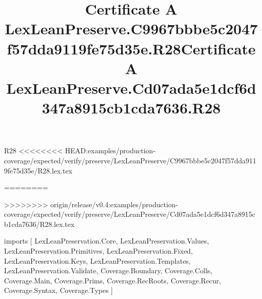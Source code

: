 \begin{lexlean}{R28}
<<<<<<<< HEAD:examples/production-coverage/expected/verify/preserve/LexLeanPreserve/C9967bbbe5c2047f57dda9119fe75d35e/R28.lex.tex
\title{Certificate A LexLeanPreserve.C9967bbbe5c2047f57dda9119fe75d35e.R28}
========
\title{Certificate A LexLeanPreserve.Cd07ada5e1dcf6d347a8915cb1cda7636.R28}
>>>>>>>> origin/release/v0.4:examples/production-coverage/expected/verify/preserve/LexLeanPreserve/Cd07ada5e1dcf6d347a8915cb1cda7636/R28.lex.tex
\begin{coremodule}
imports [
  LexLeanPreservation.Core,
  LexLeanPreservation.Values,
  LexLeanPreservation.Primitives,
  LexLeanPreservation.Fixed,
  LexLeanPreservation.Keys,
  LexLeanPreservation.Templates,
  LexLeanPreservation.Validate,
  Coverage.Boundary,
  Coverage.Colls,
  Coverage.Main,
  Coverage.Prims,
  Coverage.RecRoots,
  Coverage.Recur,
  Coverage.Syntax,
  Coverage.Types
]


\end{coremodule}
\end{lexlean}
